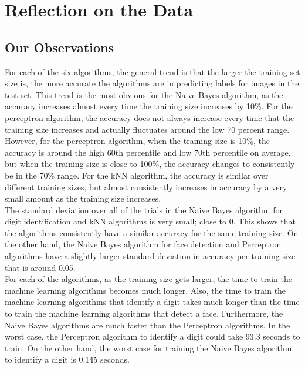 \documentclass{article}
\begin{document}
\section{Reflection on the Data}

\subsection{Our Observations}

For each of the six algorithms, the general trend is that the larger the training set size is, the more accurate the algorithms are in predicting labels for images in the test set. This trend is the most obvious for the Naive Bayes algorithm, as the accuracy increases almost every time the training size increases by 10\%. For the perceptron algorithm, the accuracy does not always increase every time that the training size increases and actually fluctuates around the low 70 percent range. However, for the perceptron algorithm, when the training size is 10\%, the accuracy is around the high 60th percentile and low 70th percentile on average, but when the training size is close to 100\%, the accuracy changes to consistently be in the 70\% range. For the kNN algorithm, the accuracy is similar over different training sizes, but almost consistently increases in accuracy by a very small amount as the training size increases.\\

The standard deviation over all of the trials in the Naive Bayes algorithm for digit identification and kNN algorithms is very small; close to 0. This shows that the algorithms consistently have a similar accuracy for the same training size. On the other hand, the Naive Bayes algorithm for face detection and Perceptron algorithms have a slightly larger standard deviation in accuracy per training size that is around 0.05.\\

For each of the algorithms, as the training size gets larger, the time to train the machine learning algorithms becomes much longer. Also, the time to train the machine learning algorithms that identify a digit takes much longer than the time to train the machine learning algorithms that detect a face. Furthermore, the Naive Bayes algorithms are much faster than the Perceptron algorithms. In the worst case, the Perceptron algorithm to identify a digit could take 93.3 seconds to train. On the other hand, the worst case for training the Naive Bayes algorithm to identify a digit is 0.145 seconds.\\
\end{document}

